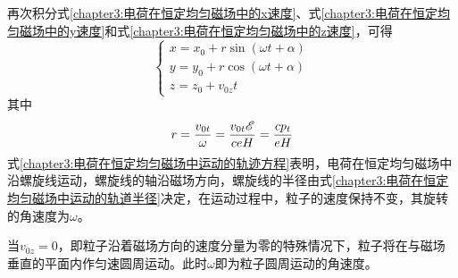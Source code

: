 再次积分式\eqref{chapter3:电荷在恒定均匀磁场中的x速度}、式\eqref{chapter3:电荷在恒定均匀磁场中的y速度}和式\eqref{chapter3:电荷在恒定均匀磁场中的z速度}，可得
\begin{equation}
\begin{cases}
	x = x_0 + r \sin(\omega t+\alpha) \\
	y = y_0 + r \cos(\omega t+\alpha) \\
	z = z_0 + v_{0z}t
\end{cases}
\label{chapter3:电荷在恒定均匀磁场中运动的轨迹方程}
\end{equation}
其中
\begin{equation}
	r = \dfrac{v_{0t}}{\omega} = \dfrac{v_{0t}\mathscr{E}}{ceH} = \frac{cp_t}{eH}
	\label{chapter3:电荷在恒定均匀磁场中运动的轨道半径}
\end{equation}
式\eqref{chapter3:电荷在恒定均匀磁场中运动的轨迹方程}表明，电荷在恒定均匀磁场中沿螺旋线运动，螺旋线的轴沿磁场方向，螺旋线的半径由式\eqref{chapter3:电荷在恒定均匀磁场中运动的轨道半径}决定，在运动过程中，粒子的速度保持不变，其旋转的角速度为$\omega$。

当$v_{0z}=0$，即粒子沿着磁场方向的速度分量为零的特殊情况下，粒子将在与磁场垂直的平面内作匀速圆周运动。此时$\omega$即为粒子圆周运动的角速度。

